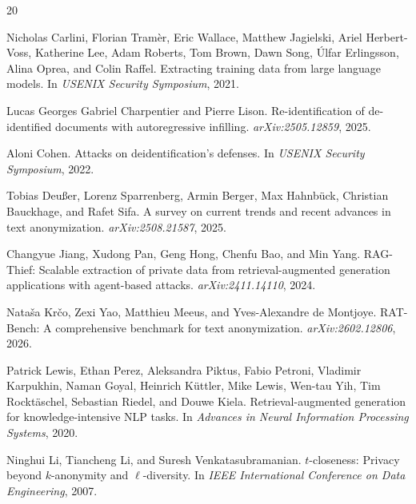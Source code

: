 \documentclass{article}
\begin{document}

\begin{thebibliography}{20}

Nicholas Carlini, Florian Tram{\`e}r, Eric Wallace, Matthew Jagielski, Ariel Herbert-Voss, Katherine Lee, Adam Roberts, Tom Brown, Dawn Song, {\'U}lfar Erlingsson, Alina Oprea, and Colin Raffel.
\newblock Extracting training data from large language models.
\newblock In \emph{USENIX Security Symposium}, 2021.

Lucas Georges Gabriel Charpentier and Pierre Lison.
\newblock Re-identification of de-identified documents with autoregressive infilling.
\newblock \emph{arXiv:2505.12859}, 2025.

Aloni Cohen.
\newblock Attacks on deidentification's defenses.
\newblock In \emph{USENIX Security Symposium}, 2022.

Tobias Deu{\ss}er, Lorenz Sparrenberg, Armin Berger, Max Hahnb{\"u}ck, Christian Bauckhage, and Rafet Sifa.
\newblock A survey on current trends and recent advances in text anonymization.
\newblock \emph{arXiv:2508.21587}, 2025.

Changyue Jiang, Xudong Pan, Geng Hong, Chenfu Bao, and Min Yang.
\newblock RAG-Thief: Scalable extraction of private data from retrieval-augmented generation applications with agent-based attacks.
\newblock \emph{arXiv:2411.14110}, 2024.

Nata{\v{s}}a Kr{\v{c}}o, Zexi Yao, Matthieu Meeus, and Yves-Alexandre de Montjoye.
\newblock RAT-Bench: A comprehensive benchmark for text anonymization.
\newblock \emph{arXiv:2602.12806}, 2026.

Patrick Lewis, Ethan Perez, Aleksandra Piktus, Fabio Petroni, Vladimir Karpukhin, Naman Goyal, Heinrich K{\"u}ttler, Mike Lewis, Wen-tau Yih, Tim Rockt{\"a}schel, Sebastian Riedel, and Douwe Kiela.
\newblock Retrieval-augmented generation for knowledge-intensive NLP tasks.
\newblock In \emph{Advances in Neural Information Processing Systems}, 2020.

Ninghui Li, Tiancheng Li, and Suresh Venkatasubramanian.
\newblock $t$-closeness: Privacy beyond $k$-anonymity and $\ell$-diversity.
\newblock In \emph{IEEE International Conference on Data Engineering}, 2007.


\end{thebibliography}
\end{document}
